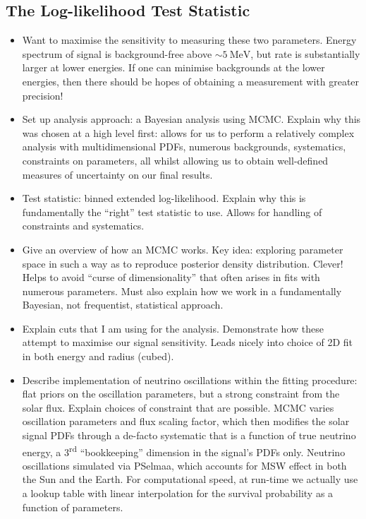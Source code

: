 \subsection{The Log-likelihood Test Statistic}

     \begin{itemize}
        \item Want to maximise the sensitivity to measuring these two parameters. Energy spectrum of signal is background-free above $\sim\SI{5}{\MeV}$, but rate is substantially larger at lower energies. If one can minimise backgrounds at the lower energies, then there should be hopes of obtaining a measurement with greater precision!
        \item Set up analysis approach: a Bayesian analysis using MCMC. Explain why this was chosen at a high level first: allows for us to perform a relatively complex analysis with multidimensional PDFs, numerous backgrounds, systematics, constraints on parameters, all whilst allowing us to obtain well-defined measures of uncertainty on our final results.
        \item Test statistic: binned extended log-likelihood. Explain why this is fundamentally the ``right''  test statistic to use. Allows for handling of constraints and systematics.
        \item Give an overview of how an MCMC works. Key idea: exploring parameter space in such a way as to reproduce posterior density distribution. Clever! Helps to avoid ``curse of dimensionality'' that often arises in fits with numerous parameters. Must also explain how we work in a fundamentally Bayesian, not frequentist, statistical approach.
        \item Explain cuts that I am using for the analysis. Demonstrate how these attempt to maximise our signal sensitivity. Leads nicely into choice of 2D fit in both energy and radius (cubed).
        \item Describe implementation of neutrino oscillations within the fitting procedure: flat priors on the oscillation parameters, but a strong constraint from the solar flux. Explain choices of constraint that are possible. MCMC varies oscillation parameters and flux scaling factor, which then modifies the solar signal PDFs through a de-facto systematic that is a function of true neutrino energy, a 3\textsuperscript{rd} ``bookkeeping'' dimension in the signal's PDFs only. Neutrino oscillations simulated via PSelmaa, which accounts for MSW effect in both the Sun and the Earth. For computational speed, at run-time we actually use a lookup table with linear interpolation for the survival probability as a function of parameters.

\end{itemize}
